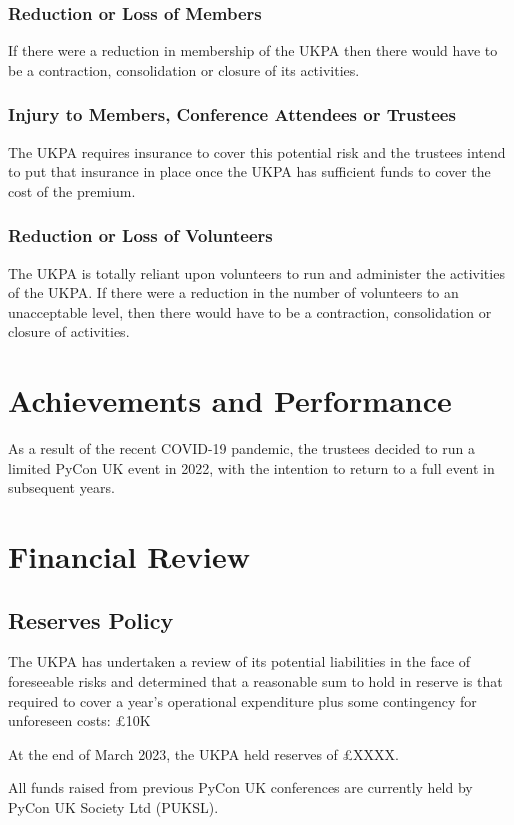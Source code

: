 \documentclass[11pt, final]{article}
\begin{document}
\subsubsection{Reduction or Loss of Members}
If there were a reduction in membership of the UKPA then there would have to be a contraction, consolidation or closure of its activities.

\subsubsection{Injury to Members, Conference Attendees or Trustees}
The UKPA requires insurance to cover this potential risk and the trustees intend to put that insurance in place once the UKPA has sufficient funds to cover the cost of the premium.

\subsubsection{Reduction or Loss of Volunteers}
The UKPA is totally reliant upon volunteers to run and administer the activities of the UKPA. If there were a reduction in the number of volunteers to an unacceptable level, then there would have to be a contraction, consolidation or closure of activities.

\section{Achievements and Performance}
As a result of the recent COVID-19 pandemic, the trustees decided to run a limited PyCon UK event in 2022, with the intention to return to a full event in subsequent years.

\section{Financial Review}

\subsection{Reserves Policy}
The UKPA has undertaken a review of its potential liabilities in the face of foreseeable risks and determined that a reasonable sum to hold in reserve is that required to cover a year's operational expenditure plus some contingency for unforeseen costs: \pounds10K

At the end of March 2023, the UKPA held reserves of \pounds XXXX.

All funds raised from previous PyCon UK conferences are currently held by PyCon UK Society Ltd (PUKSL). 
\end{document}
